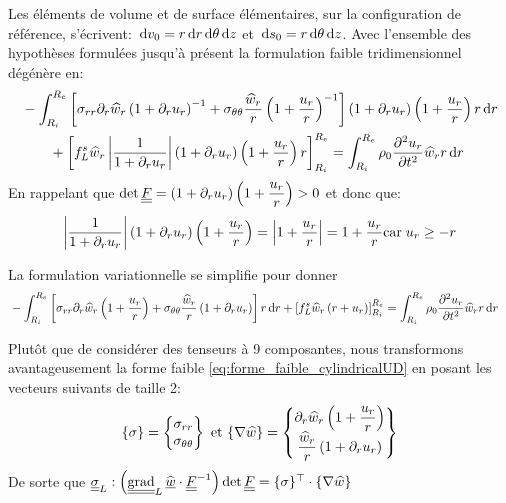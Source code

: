 \documentclass[10pt]{book}
\begin{document}
Les éléments de volume et de surface élémentaires, sur la configuration de référence, s'écrivent: $\,\mathrm{d}v_{0}=r\,\mathrm{d}r\,\mathrm{d}\theta\,\mathrm{d}z$ et $\,\mathrm{d}s_{0}=r\,\mathrm{d}\theta\,\mathrm{d}z$. Avec l'ensemble des hypothèses formulées jusqu'à présent la formulation faible tridimensionnel  dégénère en:
$$\begin{aligned}
&-\int_{R_{i}}^{R_{e}}\left[\sigma_{rr}\partial_{r}\widehat{w}_{r}\left(1+\partial_{r}u_{r}\right)^{-1}+\sigma_{\theta\theta}\dfrac{\widehat{w}_{r}}{r}\left(1+\dfrac{u_{r}}{r}\right)^{-1}\right]\left(1+\partial_{r}u_{r}\right)\left(1+\dfrac{u_{r}}{r}\right)r\,\mathrm{d}r\\
&\qquad +\left[f^{s}_{L}\widehat{w}_{r}\left|\dfrac{1}{1+\partial_{r}u_{r}}\right|\left(1+\partial_{r}u_{r}\right)\left(1+\dfrac{u_{r}}{r}\right)r\right]_{R_{i}}^{R_{e}}=\int_{R_{i}}^{R_{e}}\rho_{0}\dfrac{\partial^{2}u_{r}}{\partial t^{2}}\widehat{w}_{r}r\,\mathrm{d}r
\end{aligned}$$
En rappelant que $\det\underline{\underline{F}}=\left(1+\partial_{r}u_{r}\right)\left(1+\dfrac{u_{r}}{r}\right)>0$ et donc que:
$$\left|\dfrac{1}{1+\partial_{r}u_{r}}\right|\left(1+\partial_{r}u_{r}\right)\left(1+\dfrac{u_{r}}{r}\right)=\left|1+\dfrac{u_{r}}{r}\right|=1+\dfrac{u_{r}}{r} \text{car} \; u_{r}\geq -r$$

La formulation variationnelle se simplifie pour donner
\begin{equation}
\begin{aligned}
&-\int_{R_{i}}^{R_{e}}\left[\sigma_{rr}\partial_{r}\widehat{w}_{r}\left(1+\dfrac{u_{r}}{r}\right)+\sigma_{\theta\theta}\dfrac{\widehat{w}_{r}}{r}\left(1+\partial_{r}u_{r}\right)\right]r\,\mathrm{d}r+\left[f^{s}_{L}\widehat{w}_{r}\left(r+u_{r}\right)\right]_{R_{i}}^{R_{e}}=\int_{R_{i}}^{R_{e}}\rho_{0}\dfrac{\partial^{2}u_{r}}{\partial t^{2}}\widehat{w}_{r}r\,\mathrm{d}r
\end{aligned}
\label{eq:forme_faible_cylindricalUD}
\end{equation}

Plutôt que de considérer des tenseurs à 9 composantes, nous transformons avantageusement la forme faible \eqref{eq:forme_faible_cylindricalUD} en posant les vecteurs suivants de taille 2:
$$\{\sigma\}=\begin{Bmatrix}\sigma_{rr}\\
\sigma_{\theta\theta}\end{Bmatrix} \text{ et } \{\nabla \widehat{w}\}=\begin{Bmatrix}
\partial_{r}\widehat{w}_{r}\left(1+\dfrac{u_{r}}{r}\right)\\
\dfrac{\widehat{w}_{r}}{r}\left(1+\partial_{r}u_{r}\right)\end{Bmatrix}$$
De sorte que $\SC_{L}:\left(\tgrad_{L}\DepVirt\cdot\GT^{-1}\right)\det\GT=\{\sigma\}^{\top}\cdot\{\nabla\hat{w}\}$\\
\end{document}
